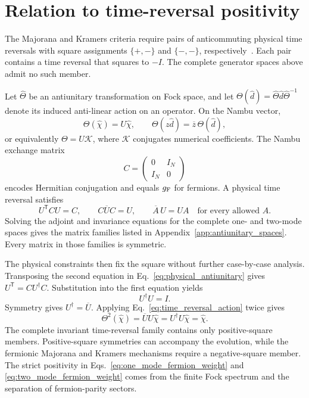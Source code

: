 \documentclass[onecolumn,aps,prb,amsmath,amssymb,superscriptaddress,longbibliography]{revtex4-2}
\newcommand{\trans}{\mathsf{T}}
\newcommand{\mc}[1]{\mathcal{#1}}
\begin{document}
\section{Relation to time-reversal positivity}

The Majorana and Kramers criteria require pairs of anticommuting physical time
reversals with square assignments \(\{+,-\}\) and \(\{-,-\}\),
respectively~\cite{li2016prl}.  Each pair contains a time reversal that squares
to \(-I\).  The complete generator spaces above admit no such member.

Let \(\widehat\Theta\) be an antiunitary transformation on Fock space, and let
\(\Theta(\hat d)=\widehat\Theta\hat d\widehat\Theta^{-1}\) denote its induced
anti-linear action on an operator.  On the Nambu vector,
\begin{equation}
    \Theta(\hat\chi)=U\hat\chi,
    \qquad
    \Theta(z\hat d)=\overline z\,\Theta(\hat d),
    \label{eq:time_reversal_action}
\end{equation}
or equivalently \(\Theta=U\mc K\), where \(\mc K\) conjugates numerical
coefficients.  The Nambu exchange matrix
\begin{equation}
    C=\begin{pmatrix}0&I_N\\ I_N&0\end{pmatrix}
    \label{eq:nambu_exchange}
\end{equation}
encodes Hermitian conjugation and equals \(g_{\rm F}\) for fermions.  A
physical time reversal satisfies
\begin{equation}
    U^\trans C U=C,\qquad
    C\overline U C=U,\qquad
    \overline A\,U=UA
    \quad\text{for every allowed }A .
    \label{eq:physical_antiunitary}
\end{equation}
Solving the adjoint and invariance equations for the complete one- and
two-mode spaces gives the matrix families listed in
Appendix~\ref{app:antiunitary_spaces}.  Every matrix in those families is
symmetric.

The physical constraints then fix the square without further case-by-case
analysis.  Transposing the second equation in
Eq.~\eqref{eq:physical_antiunitary} gives
\(U^\trans=CU^\dagger C\).  Substitution into the first equation yields
\begin{equation}
    U^\dagger U=I .
    \label{eq:antiunitary_unitarity}
\end{equation}
Symmetry gives \(U^\dagger=\overline U\).  Applying Eq.~\eqref{eq:time_reversal_action}
twice gives
\begin{equation}
    \Theta^2(\hat\chi)
    =\overline U U\hat\chi
    =U^\dagger U\hat\chi
    =\hat\chi .
    \label{eq:antiunitary_square}
\end{equation}
The complete invariant time-reversal family contains only positive-square
members.  Positive-square symmetries can accompany the evolution, while the
fermionic Majorana and Kramers mechanisms require a negative-square member.
The strict positivity in Eqs.~\eqref{eq:one_mode_fermion_weight} and
\eqref{eq:two_mode_fermion_weight} comes from the finite Fock spectrum and the
separation of fermion-parity sectors.
\end{document}
